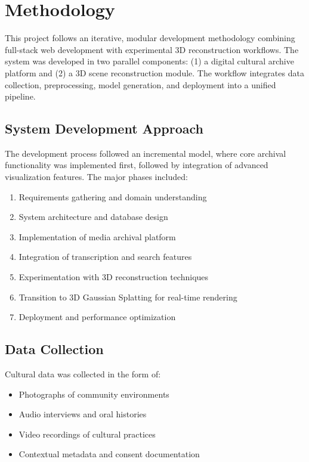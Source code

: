 \section{Methodology}

This project follows an iterative, modular development methodology combining full-stack web development with experimental 3D reconstruction workflows. The system was developed in two parallel components: (1) a digital cultural archive platform and (2) a 3D scene reconstruction module. The workflow integrates data collection, preprocessing, model generation, and deployment into a unified pipeline.

\subsection{System Development Approach}

The development process followed an incremental model, where core archival functionality was implemented first, followed by integration of advanced visualization features. The major phases included:

\begin{enumerate}
    \item Requirements gathering and domain understanding
    \item System architecture and database design
    \item Implementation of media archival platform
    \item Integration of transcription and search features
    \item Experimentation with 3D reconstruction techniques
    \item Transition to 3D Gaussian Splatting for real-time rendering
    \item Deployment and performance optimization
\end{enumerate}

\subsection{Data Collection}

Cultural data was collected in the form of:
\begin{itemize}
    \item Photographs of community environments
    \item Audio interviews and oral histories
    \item Video recordings of cultural practices
    \item Contextual metadata and consent documentation
\end{itemize}


